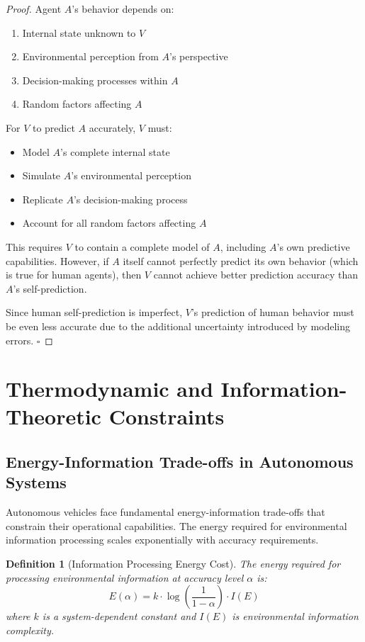 \documentclass[12pt,a4paper]{article}
\newtheorem{definition}[theorem]{Definition}
\begin{document}
\begin{proof}
Agent $A$'s behavior depends on:
\begin{enumerate}
\item Internal state unknown to $V$
\item Environmental perception from $A$'s perspective
\item Decision-making processes within $A$
\item Random factors affecting $A$
\end{enumerate}

For $V$ to predict $A$ accurately, $V$ must:
\begin{itemize}
\item Model $A$'s complete internal state
\item Simulate $A$'s environmental perception
\item Replicate $A$'s decision-making process
\item Account for all random factors affecting $A$
\end{itemize}

This requires $V$ to contain a complete model of $A$, including $A$'s own predictive capabilities. However, if $A$ itself cannot perfectly predict its own behavior (which is true for human agents), then $V$ cannot achieve better prediction accuracy than $A$'s self-prediction.

Since human self-prediction is imperfect, $V$'s prediction of human behavior must be even less accurate due to the additional uncertainty introduced by modeling errors. $\square$
\end{proof}

\section{Thermodynamic and Information-Theoretic Constraints}

\subsection{Energy-Information Trade-offs in Autonomous Systems}

Autonomous vehicles face fundamental energy-information trade-offs that constrain their operational capabilities. The energy required for environmental information processing scales exponentially with accuracy requirements.

\begin{definition}[Information Processing Energy Cost]
The energy required for processing environmental information at accuracy level $\alpha$ is:
$$E(\alpha) = k \cdot \log\left(\frac{1}{1-\alpha}\right) \cdot I(E)$$
where $k$ is a system-dependent constant and $I(E)$ is environmental information complexity.
\end{definition}
\end{document}
